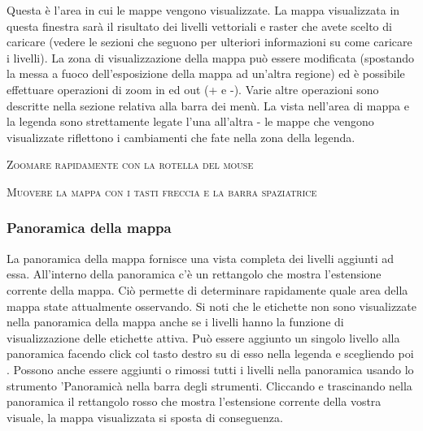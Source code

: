 Questa è l’area in cui le mappe vengono visualizzate. La mappa visualizzata in questa finestra sarà
il risultato dei livelli vettoriali e raster che avete scelto di caricare (vedere le sezioni che seguono
per ulteriori informazioni su come caricare i livelli). La zona di visualizzazione della mappa può
essere modificata (spostando la messa a fuoco dell’esposizione della mappa ad un’altra regione) ed
è possibile effettuare operazioni di zoom in ed out (+ e -). Varie altre operazioni sono descritte nella
sezione relativa alla barra dei menù. La vista nell’area di mappa e la legenda sono strettamente
legate l’una all’altra - le mappe che vengono visualizzate riflettono i cambiamenti che fate nella zona
della legenda.  

\begin{Tip}\caption{\textsc{Zoomare rapidamente con la rotella del mouse}}
\end{Tip}

\begin{Tip}\caption{\textsc{Muovere la mappa con i tasti freccia e la barra
spaziatrice}}
\end{Tip}

\subsubsection{Panoramica della mappa}\label{label_mapoverview}

La panoramica della mappa fornisce una vista completa dei livelli aggiunti ad
essa. All’interno della panoramica c’è un rettangolo che mostra l’estensione
corrente della mappa. Ciò permette di determinare rapidamente quale area
della mappa state attualmente osservando. Si noti che le etichette non sono
visualizzate nella panoramica della mappa anche se i livelli hanno la funzione di visualizzazione
delle etichette attiva.
Può essere aggiunto un singolo livello alla panoramica facendo click col tasto destro su di esso nella legenda e scegliendo poi . Possono anche essere aggiunti o rimossi tutti i livelli nella
panoramica usando lo strumento 'Panoramicà nella barra
degli strumenti. Cliccando e trascinando nella panoramica il rettangolo rosso che mostra
l'estensione corrente della vostra visuale, la mappa visualizzata si sposta di
conseguenza.


